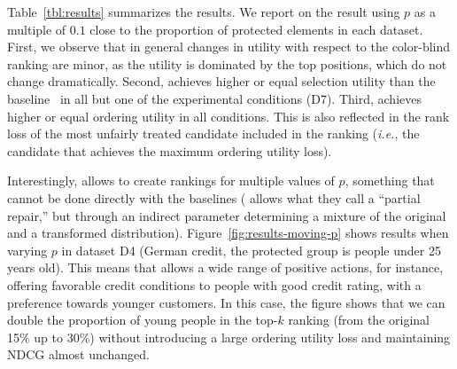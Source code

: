 Table~\ref{tbl:results} summarizes the results. We report on the result using $p$ as a multiple of $0.1$ close to the proportion of protected elements in each dataset.
%
First, we observe that in general changes in utility with respect to the color-blind ranking are minor, as the utility is dominated by the top positions, which do not change dramatically.
%
Second, \algoFAIR achieves higher or equal selection utility than the baseline~\cite{Feldman2015} in all but one of the experimental conditions (D7).
%
Third, \algoFAIR achieves higher or equal ordering utility in all conditions. This is also reflected in the rank loss of the most unfairly
treated candidate included in the ranking ({\em i.e.}, the candidate that achieves the maximum ordering utility loss). %

Interestingly, \algoFAIR allows to create rankings for multiple values of $p$, something that cannot be done directly with the baselines (\citet{Feldman2015} allows what they call a ``partial repair,'' but through an indirect parameter determining a mixture of the original and a transformed distribution).
%
Figure~\ref{fig:results-moving-p} shows results when varying $p$ in dataset D4 (German credit, the protected group is people under 25 years old).
%
This means that \algoFAIR allows a wide range of positive actions, for instance, offering favorable credit conditions to people with good credit rating, with a preference towards younger customers.
%
In this case, the figure shows that we can double the proportion of young people in the top-$k$ ranking (from the original 15\% up to 30\%) without introducing a large ordering utility loss and maintaining NDCG almost unchanged.

